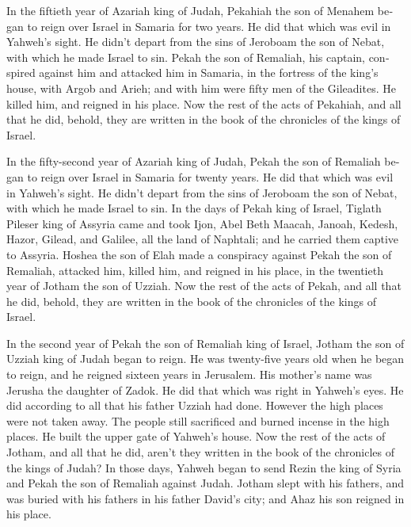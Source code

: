 \begin{paracol}{2}
\begin{otherlanguage}{english}
 In the fiftieth year of Azariah king of Judah, Pekahiah
the son of Menahem began to reign over Israel in Samaria for two years.
 He did that which was evil in Yahweh's sight. He didn't
depart from the sins of Jeroboam the son of Nebat, with which he made
Israel to sin.  Pekah the son of Remaliah, his captain,
conspired against him and attacked him in Samaria, in the fortress of
the king's house, with Argob and Arieh; and with him were fifty men of
the Gileadites. He killed him, and reigned in his place. 
Now the rest of the acts of Pekahiah, and all that he did, behold, they
are written in the book of the chronicles of the kings of Israel.

 In the fifty-second year of Azariah king of Judah, Pekah
the son of Remaliah began to reign over Israel in Samaria for twenty
years.  He did that which was evil in Yahweh's sight. He
didn't depart from the sins of Jeroboam the son of Nebat, with which he
made Israel to sin.  In the days of Pekah king of Israel,
Tiglath Pileser king of Assyria came and took Ijon, Abel Beth Maacah,
Janoah, Kedesh, Hazor, Gilead, and Galilee, all the land of Naphtali;
and he carried them captive to Assyria.  Hoshea the son
of Elah made a conspiracy against Pekah the son of Remaliah, attacked
him, killed him, and reigned in his place, in the twentieth year of
Jotham the son of Uzziah.  Now the rest of the acts of
Pekah, and all that he did, behold, they are written in the book of the
chronicles of the kings of Israel.

 In the second year of Pekah the son of Remaliah king of
Israel, Jotham the son of Uzziah king of Judah began to reign.
 He was twenty-five years old when he began to reign, and
he reigned sixteen years in Jerusalem. His mother's name was Jerusha the
daughter of Zadok.  He did that which was right in
Yahweh's eyes. He did according to all that his father Uzziah had done.
 However the high places were not taken away. The people
still sacrificed and burned incense in the high places. He built the
upper gate of Yahweh's house.  Now the rest of the acts
of Jotham, and all that he did, aren't they written in the book of the
chronicles of the kings of Judah?  In those days, Yahweh
began to send Rezin the king of Syria and Pekah the son of Remaliah
against Judah.  Jotham slept with his fathers, and was
buried with his fathers in his father David's city; and Ahaz his son
reigned in his place.


\end{otherlanguage}
\end{paracol}
